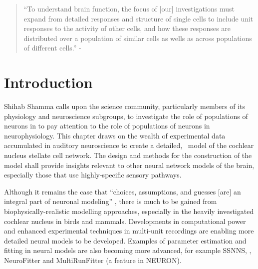 
\begin{quotation}
  ``To understand brain function, the focus of [our] investigations must expand
  from detailed responses and structure of single cells to include unit
  responses to the activity of other cells, and how these responses are
  distributed over a population of similar cells as wells as across populations
  of different cells.''  - \textit{\citet[p.]{Shamma:1998}}
\end{quotation}






\section{Introduction    \label{sec:CN:introduction}}

Shihab Shamma calls upon the science community, particularly members of its
physiology and neuroscience subgroups, to investigate the role of populations of
neurons in to pay attention to the role of populations of neurons in
neurophysiology. This chapter draws on the wealth of experimental data
accumulated in auditory neuroscience to create a detailed, \BNN~model of the
cochlear nucleus stellate cell network. The design and methods for the
construction of the model shall provide insights relevant to other neural
network models of the brain, especially those that use highly-specific sensory
pathways.  


Although it remains the case that ``choices, assumptions, and guesses [are] an
integral part of neuronal modeling'' \citep{SegevBurkeEtAl:1998}
, there is much to be gained from biophysically-realistic
modelling approaches, especially in the heavily investigated cochlear nucleus in
birds and mammals. Developments in computational power and enhanced experimental
techniques in multi-unit recordings are enabling more detailed neural models to
be developed. Examples of parameter estimation and fitting in neural models are
also becoming more advanced, for example SSNNS,
\citep{SichtigSchafferEtAl:2008}, NeuroFitter \citep{VanAchardEtAl:2007} and
MultiRunFitter (a feature in NEURON).

